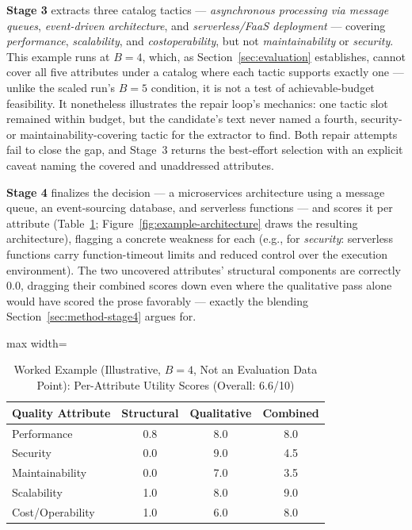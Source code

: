 \documentclass[preprint,12pt,authoryear]{elsarticle}
\renewcommand{\_}{\textunderscore\allowbreak{}}
\begin{document}
\textbf{Stage 3} extracts three catalog tactics --- \emph{asynchronous processing via message queues}, \emph{event-driven architecture}, and \emph{serverless/FaaS deployment} --- covering \emph{performance}, \emph{scalability}, and \emph{cost\_operability}, but not \emph{maintainability} or \emph{security}. This example runs at $B=4$, which, as Section~\ref{sec:evaluation} establishes, cannot cover all five attributes under a catalog where each tactic supports exactly one --- unlike the scaled run's $B=5$ condition, it is not a test of achievable-budget feasibility. It nonetheless illustrates the repair loop's mechanics: one tactic slot remained within budget, but the candidate's text never named a fourth, security- or maintainability-covering tactic for the extractor to find. Both repair attempts fail to close the gap, and Stage~3 returns the best-effort selection with an explicit caveat naming the covered and unaddressed attributes.

\textbf{Stage 4} finalizes the decision --- a microservices architecture using a message queue, an event-sourcing database, and serverless functions --- and scores it per attribute (Table~\ref{tab:worked-example}; Figure~\ref{fig:example-architecture} draws the resulting architecture), flagging a concrete weakness for each (e.g., for \emph{security}: serverless functions carry function-timeout limits and reduced control over the execution environment). The two uncovered attributes' structural components are correctly $0.0$, dragging their combined scores down even where the qualitative pass alone would have scored the prose favorably --- exactly the blending Section~\ref{sec:method-stage4} argues for.

\begin{table}[!htbp]
\caption{Worked Example (Illustrative, $B=4$, Not an Evaluation Data Point): Per-Attribute Utility Scores (Overall: 6.6/10)\label{tab:worked-example}}
\centering
\footnotesize
\begin{adjustbox}{max width=\textwidth}
\begin{tabular}{@{}lccc@{}}
\toprule
Quality Attribute & Structural & Qualitative & Combined \\
\midrule
Performance       & 0.8 & 8.0 & 8.0 \\
Security          & 0.0 & 9.0 & 4.5 \\
Maintainability   & 0.0 & 7.0 & 3.5 \\
Scalability       & 1.0 & 8.0 & 9.0 \\
Cost/Operability  & 1.0 & 6.0 & 8.0 \\
\bottomrule
\end{tabular}
\end{adjustbox}
\end{table}
\FloatBarrier
\end{document}

